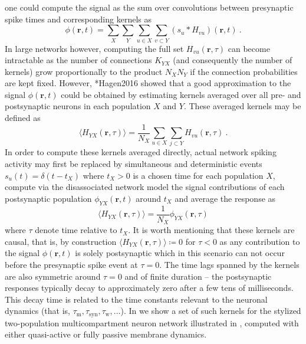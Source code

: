 one could compute the signal as the sum over convolutions between presynaptic spike times and corresponding kernels as
\begin{equation}
\phi(\mathbf{r}, t) = \sum_X \sum_Y \sum_{u \in X} \sum_{v \subset Y} \left(s_u \ast H_{vu} \right)(\mathbf{r}, t)~.
\end{equation}
In large networks however,
computing the full set $H_{vu}(\mathbf{r},\tau)$ can become intractable as the number of connections $K_{YX}$ (and consequently the number of kernels) grow proportionally to the product $N_X N_Y$ if the connection probabilities are kept fixed.
However, \citeasnoun**{Hagen2016} showed that a good approximation to the signal $\phi(\mathbf{r}, t)$ could be obtained by estimating kernels averaged over all pre- and postsynaptic neurons in each population $X$ and $Y$. These averaged kernels may be defined as
\begin{equation}
\langle H_{YX} (\mathbf{r}, \tau) \rangle = \frac{1}{N_X} \sum_{u \in X} \sum_{j \subset Y} H_{vu}(\mathbf{r}, \tau)~.
\end{equation}
In order to compute these kernels averaged directly,
actual network spiking activity may first be replaced by simultaneous and deterministic events
$s_u(t) = \delta(t - t_X)$ where $t_X > 0$ is a chosen time for each population $X$,
compute via the disassociated network model the signal contributions of each postsynaptic population $\phi_{YX}(\mathbf{r}, t)$ around $t_X$
and average the response as
\begin{equation}
\langle H_{YX} (\mathbf{r}, \tau) \rangle = \frac{1}{N_X} \phi_{YX} (\mathbf{r}, \tau)
\end{equation}
where $\tau$ denote time relative to $t_X$.
It is worth mentioning that these kernels are causal, that is,
by construction $\langle H_{YX}(\mathbf{r}, \tau) \rangle \coloneq 0$ for $\tau < 0$ as any contribution to the signal $\phi(\mathbf{r}, t)$ is solely postsynaptic which in this scenario can not occur before the presynaptic spike event at $\tau=0$.
The time lags spanned by the kernels are also symmetric around $\tau=0$ and of finite duration --
the postsynaptic responses typically decay to approximately zero after a few tens of milliseconds.
This decay time is related to the time constants relevant to the neuronal dynamics (that is, $\tau_\mathrm{m}, \tau_\mathrm{syn}, \tau_\mathrm{w}, \ldots$).  
In  we show a set of such kernels for the stylized two-population multicompartment neuron network illustrated in , 
computed with either quasi-active or fully passive membrane dynamics. 



